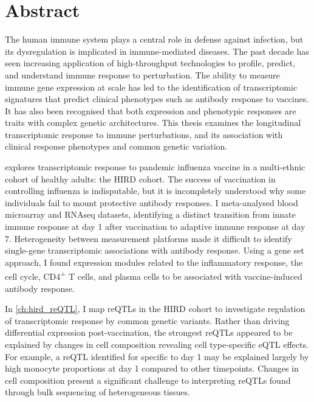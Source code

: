 %
%

\chapter{Abstract}



The human immune system plays a central role in defense against infection, 
but its dysregulation is implicated in immune-mediated diseases.
The past decade has seen increasing application of high-throughput technologies to profile, predict, and understand immune response to perturbation.
The ability to measure immune gene expression at scale has led to the identification of 
transcriptomic signatures that predict clinical phenotypes such as antibody response to vaccines.
It has also been recognised that both expression and phenotypic responses are traits with complex genetic architectures.
This thesis examines the longitudinal transcriptomic response to immune perturbations,
and its association with clinical response phenotypes and common genetic variation.

 explores transcriptomic response to pandemic influenza vaccine in a multi-ethnic cohort of healthy adults: the \gls{HIRD} cohort.
The success of vaccination in controlling influenza is indisputable, 
but it is incompletely understood why some individuals fail to mount protective antibody responses.
I meta-analysed blood microarray and \gls{RNAseq} datasets, 
identifying a distinct transition from innate immune response at day 1 after vaccination to adaptive immune response at day 7.
Heterogeneity between measurement platforms made it difficult to identify single-gene transcriptomic associations with antibody response.
Using a gene set approach, I found expression modules related to the inflammatory response, the cell cycle, CD4\textsuperscript{+} T cells, and plasma cells 
to be associated with vaccine-induced antibody response.

In \cref{ch:hird_reQTL}, I map \glspl{reQTL} in the \gls{HIRD} cohort to investigate regulation of transcriptomic response by common genetic variants.
Rather than driving differential expression post-vaccination,
the strongest \glspl{reQTL} appeared to be explained by changes in cell composition revealing cell type-specific \gls{eQTL} effects.
For example, a \gls{reQTL} identified for  specific to day 1 may be explained largely by high monocyte proportions at day 1 compared to other timepoints.
Changes in cell composition present a significant challenge to interpreting \glspl{reQTL} found through bulk sequencing of heterogeneous tissues.

